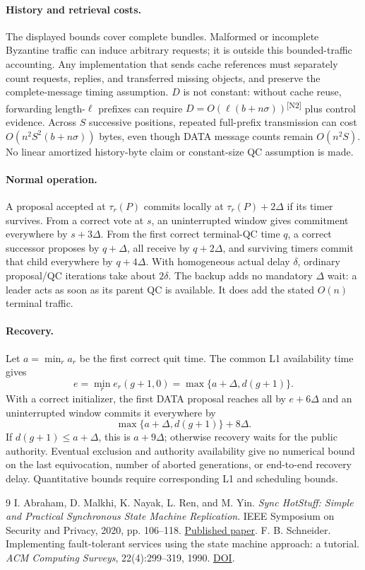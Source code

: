 \documentclass[11pt,a4paper]{article}
\newcommand{\CH}[1]{\textsuperscript{\color{diffNew}\sffamily\scriptsize[#1]}}
\newcommand{\CH}[1]{}
\begin{document}
\paragraph{History and retrieval costs.}
The displayed bounds cover complete bundles. Malformed or incomplete
Byzantine traffic can induce arbitrary requests; it is outside this
bounded-traffic accounting. Any implementation that sends cache references
must separately count requests, replies, and transferred missing objects,
and preserve the complete-message timing assumption. $D$ is not constant:
without cache reuse, forwarding length-$\ell$ prefixes can require
$D=O(\ell(b+n\sigma))$\CH{N2} plus control evidence. Across $S$ successive
positions, repeated full-prefix transmission can cost
$O(n^2S^2(b+n\sigma))$ bytes, even though DATA message counts remain
$O(n^2S)$. No linear amortized history-byte claim or constant-size QC
assumption is made.

\paragraph{Normal operation.}
A proposal accepted at $\tau_r(P)$ commits locally at
$\tau_r(P)+2\Delta$ if its timer survives. From a correct vote at $s$,
an uninterrupted window gives commitment everywhere by $s+3\Delta$.
From the first correct terminal-QC time $q$, a correct successor proposes
by $q+\Delta$, all receive by $q+2\Delta$, and surviving timers commit
that child everywhere by $q+4\Delta$. With homogeneous actual delay
$\delta$, ordinary proposal/QC iterations take about $2\delta$.
The backup adds no mandatory $\Delta$ wait: a leader acts as soon as
its parent QC is available. It does add the stated $O(n)$ terminal traffic.

\paragraph{Recovery.}
Let $a=\min_r a_r$ be the first correct quit time. The common L1
availability time gives
\[
 e=\min_r e_r(g+1,0)=\max\{a+\Delta,d(g+1)\}.
\]
With a correct initializer, the first DATA proposal reaches all by
$e+6\Delta$ and an uninterrupted window commits it everywhere by
\[
 \max\{a+\Delta,d(g+1)\}+8\Delta.
\]
If $d(g+1)\le a+\Delta$, this is $a+9\Delta$; otherwise recovery
waits for the public authority. Eventual exclusion and
authority availability give no numerical bound on the last equivocation,
number of aborted generations, or end-to-end recovery delay. Quantitative
bounds require corresponding L1 and scheduling bounds.

\begin{thebibliography}{9}
I. Abraham, D. Malkhi, K. Nayak, L. Ren, and M. Yin.
\emph{Sync HotStuff: Simple and Practical Synchronous State Machine Replication}.
IEEE Symposium on Security and Privacy, 2020, pp. 106--118.
\href{https://conferences.computer.org/sp/pdfs/sp/2020/349700a106.pdf}{Published paper}.
F. B. Schneider. Implementing fault-tolerant services using the state machine
approach: a tutorial. \emph{ACM Computing Surveys}, 22(4):299--319, 1990.
\href{https://doi.org/10.1145/98163.98167}{DOI}.
\end{thebibliography}
\end{document}
